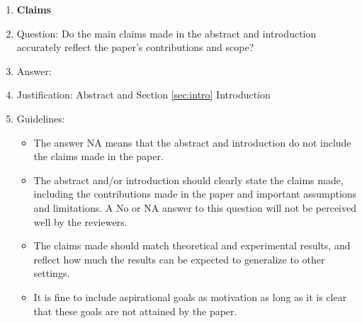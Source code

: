 \documentclass{article}
\begin{document}


\begin{enumerate}

\item {\bf Claims}
    \item[] Question: Do the main claims made in the abstract and introduction accurately reflect the paper's contributions and scope?
    \item[] Answer: \answerYes{} %
    \item[] Justification: Abstract and Section \ref{sec:intro} Introduction
    \item[] Guidelines:
    \begin{itemize}
        \item The answer NA means that the abstract and introduction do not include the claims made in the paper.
        \item The abstract and/or introduction should clearly state the claims made, including the contributions made in the paper and important assumptions and limitations. A No or NA answer to this question will not be perceived well by the reviewers. 
        \item The claims made should match theoretical and experimental results, and reflect how much the results can be expected to generalize to other settings. 
        \item It is fine to include aspirational goals as motivation as long as it is clear that these goals are not attained by the paper. 
    \end{itemize}


\end{enumerate}
\end{document}
